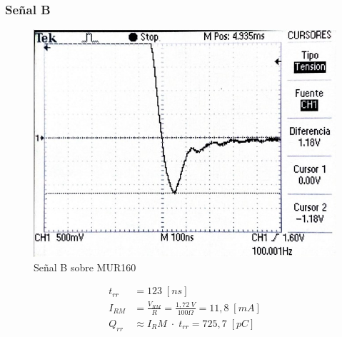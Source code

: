\documentclass{article}
\begin{document}
\subsubsection{Señal B}
\begin{figure}[h!]
 \begin{center}
	\includegraphics[scale=0.5]{imagenes/MUR_B.jpg} 
	\caption{Señal B sobre MUR160}
 \end{center}
\end{figure}
%
\begin{align*}
	t_{rr} &= 123 \; [ns] \\
	I_{RM}	&= \frac{V_{RM}}{R} = \frac{1,72 \; V}{100 \Omega} = 11,8 \; [mA]\\
	Q_{rr}	&\approx {I_RM} \; \cdot \; t_{rr} = 725,7 \; [pC]
\end{align*}
%
\end{document}
